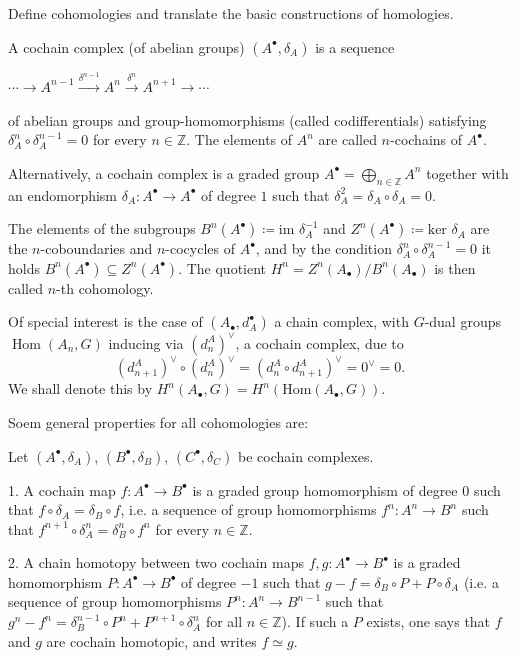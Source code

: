 Define cohomologies and translate the basic constructions of homologies.

A cochain complex (of abelian groups) \( (A^\bullet, \delta_A) \) is a sequence 

\(\cdots \xrightarrow{} A^{n-1} \xrightarrow{\delta^{n-1}} A^n \xrightarrow{\delta^{n}} A^{n+1} \xrightarrow{} \cdots\)

of abelian groups and group-homomorphisms (called codifferentials) satisfying \( \delta_A^n \circ \delta_A^{n-1} = 0 \)
for every \( n \in \mathbb{Z} \). The elements of \( A^n \) are called \(n\)-cochains of \(A^\bullet\). 

Alternatively, a cochain complex is a graded group \(A^\bullet = \bigoplus_{n \in \mathbb{Z}} A^n\)
together with an endomorphism \(\delta_A : A^\bullet \to A^\bullet\) of degree \( 1 \) such that \(\delta_A^2 = \delta_A \circ \delta_A = 0\).

The elements of the subgroups \( B^n(A^\bullet) \coloneqq \text{im } \delta_A^{-1} \) and \( Z^n(A^\bullet) \coloneqq \text{ker } \delta_A \) 
are the \( n \)-coboundaries and \( n \)-cocycles of \( A^\bullet \), and by the condition \( \delta^n_A \circ \delta^{n-1}_A = 0\)
it holds \( B^n(A^\bullet) \subseteq Z^n(A^\bullet) \). The quotient \( H^n = Z^n(A_\bullet) / B^n(A_\bullet) \) is then called 
\( n \)-th cohomology.

Of special interest is the case of \((A_\bullet, d_A^\bullet)\) a chain complex, with \( G \)-dual groups \(\operatorname{Hom}(A_n, G)\) inducing via
\((d_n^A)^\vee\), a cochain complex, due to
\[
(d_{n+1}^A)^\vee \circ (d_n^A)^\vee = (d_n^A \circ d_{n+1}^A)^\vee = 0^\vee = 0.
\]
We shall denote this by \( H^n(A_\bullet, G) = H^n(\text{Hom}(A_\bullet, G)) \).

Soem general properties for all cohomologies are:

Let \( (A^\bullet, \delta_A) \), \( (B^\bullet, \delta_B) \), \((C^\bullet, \delta_C)\) be cochain complexes.

1. A cochain map \(f \colon A^\bullet \to B^\bullet\) is a graded group homomorphism of degree 0 such that 
\(f \circ \delta_A = \delta_B \circ f\), i.e. a sequence of group homomorphisms \(f^n \colon A^n \to B^n\) 
such that \(f^{n+1} \circ \delta_A^n = \delta_B^n \circ f^n\) for every \(n \in \mathbb{Z}\).

2. A chain homotopy between two cochain maps \(f, g \colon A^\bullet \to B^\bullet\) is a graded homomorphism 
\(P \colon A^\bullet \to B^\bullet\) of degree \(-1\) such that \(g - f = \delta_B \circ P + P \circ \delta_A\) 
(i.e. a sequence of group homomorphisms \(P^n \colon A^n \to B^{n-1}\) such that 
\(g^n - f^n = \delta_B^{n-1} \circ P^n + P^{n+1} \circ \delta_A^n\) for all \(n \in \mathbb{Z}\)). 
If such a \(P\) exists, one says that \(f\) and \(g\) are cochain homotopic, and writes \(f \simeq g\).

